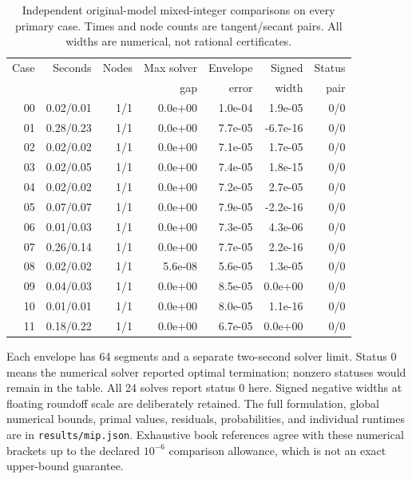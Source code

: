 \begin{table}[p]\centering
\caption{Independent original-model mixed-integer comparisons on every primary case. Times and node counts are tangent/secant pairs. All widths are numerical, not rational certificates.}\label{tab:r47-mip}
\begin{tabular}{rrrrrrr}\toprule
Case & Seconds & Nodes & Max solver & Envelope & Signed & Status \\
 & & & gap & error & width & pair \\\midrule
00 & 0.02/0.01 & 1/1 & 0.0e+00 & 1.0e-04 & 1.9e-05 & 0/0 \\
01 & 0.28/0.23 & 1/1 & 0.0e+00 & 7.7e-05 & -6.7e-16 & 0/0 \\
02 & 0.02/0.02 & 1/1 & 0.0e+00 & 7.1e-05 & 1.7e-05 & 0/0 \\
03 & 0.02/0.05 & 1/1 & 0.0e+00 & 7.4e-05 & 1.8e-15 & 0/0 \\
04 & 0.02/0.02 & 1/1 & 0.0e+00 & 7.2e-05 & 2.7e-05 & 0/0 \\
05 & 0.07/0.07 & 1/1 & 0.0e+00 & 7.9e-05 & -2.2e-16 & 0/0 \\
06 & 0.01/0.03 & 1/1 & 0.0e+00 & 7.3e-05 & 4.3e-06 & 0/0 \\
07 & 0.26/0.14 & 1/1 & 0.0e+00 & 7.7e-05 & 2.2e-16 & 0/0 \\
08 & 0.02/0.02 & 1/1 & 5.6e-08 & 5.6e-05 & 1.3e-05 & 0/0 \\
09 & 0.04/0.03 & 1/1 & 0.0e+00 & 8.5e-05 & 0.0e+00 & 0/0 \\
10 & 0.01/0.01 & 1/1 & 0.0e+00 & 8.0e-05 & 1.1e-16 & 0/0 \\
11 & 0.18/0.22 & 1/1 & 0.0e+00 & 6.7e-05 & 0.0e+00 & 0/0 \\
\bottomrule\end{tabular}
\par\smallskip\raggedright Each envelope has 64 segments and a separate two-second solver limit. Status 0 means the numerical solver reported optimal termination; nonzero statuses would remain in the table. All 24 solves report status 0 here. Signed negative widths at floating roundoff scale are deliberately retained. The full formulation, global numerical bounds, primal values, residuals, probabilities, and individual runtimes are in \texttt{results/mip.json}. Exhaustive book references agree with these numerical brackets up to the declared $10^{-6}$ comparison allowance, which is not an exact upper-bound guarantee.
\end{table}

